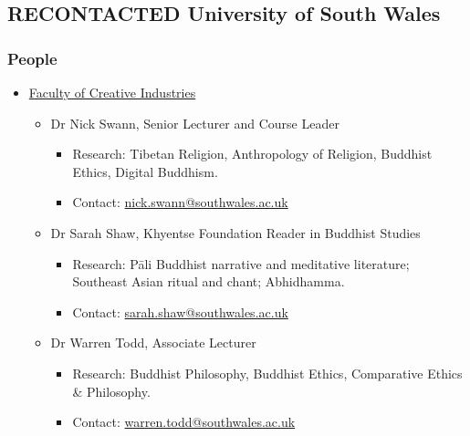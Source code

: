 \documentclass[11pt]{article}
\begin{document}
\subsection*{{\bfseries\sffamily RECONTACTED} University of South Wales}
\label{sec:org8765d30}
\subsubsection*{People}
\label{sec:org896860e}
\begin{itemize}
\item \href{https://www.southwales.ac.uk/courses/faculty/FCI/?faculty\_title=Faculty+of+Creative+Industries}{Faculty of Creative Industries}
\label{sec:org3eb711b}
\begin{itemize}
\item Dr Nick Swann, Senior Lecturer and Course Leader
\label{sec:orgbd48926}
\begin{itemize}
\item Research: Tibetan Religion, Anthropology of Religion, Buddhist Ethics, Digital Buddhism.\\
\item Contact: \href{mailto:nick.swann@southwales.ac.uk}{nick.swann@southwales.ac.uk}\\
\end{itemize}
\item Dr Sarah Shaw, Khyentse Foundation Reader in Buddhist Studies
\label{sec:org6d4fb03}
\begin{itemize}
\item Research: Pāli Buddhist narrative and meditative literature; Southeast Asian ritual and chant; Abhidhamma.\\
\item Contact: \href{mailto:sarah.shaw@southwales.ac.uk}{sarah.shaw@southwales.ac.uk}\\
\end{itemize}
\item Dr Warren Todd, Associate Lecturer
\label{sec:org83c6229}
\begin{itemize}
\item Research: Buddhist Philosophy, Buddhist Ethics, Comparative Ethics \& Philosophy.\\
\item Contact: \href{mailto:warren.todd@southwales.ac.uk}{warren.todd@southwales.ac.uk}\\
\end{itemize}
\end{itemize}
\end{itemize}
\end{document}
